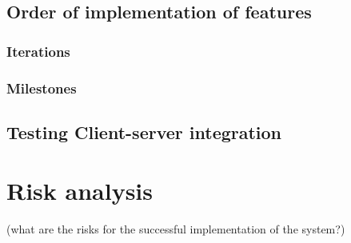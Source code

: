 \documentclass[a4paper]{article}
\begin{document}
\subsection{Order of implementation of features}

\subsubsection{Iterations}

\subsubsection{Milestones}




\subsection{Testing Client-server integration}


\section{Risk analysis}
(what are the risks for the successful implementation of the system?)
\end{document}
